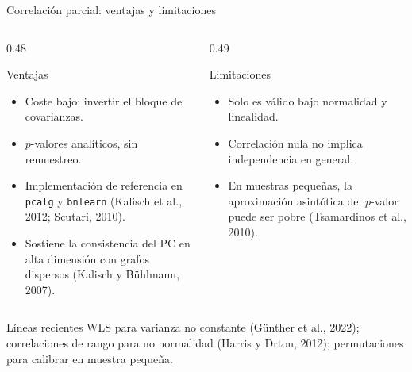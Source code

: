 \documentclass[aspectratio=169,11pt]{beamer}
\newcommand{\srccite}[1]{{\scriptsize\color{upmgray}(#1)}}
\begin{document}
\begin{frame}[t]{Correlación parcial: ventajas y limitaciones}
  \small
  \begin{columns}[T,onlytextwidth]
    \begin{column}{0.48\textwidth}
      \begin{block}{Ventajas}
        \begin{itemize}
          \item Coste bajo: invertir el bloque de covarianzas.
          \item $p$-valores analíticos, sin remuestreo.
          \item Implementación de referencia en \texttt{pcalg} y
                \texttt{bnlearn} \srccite{Kalisch et al., 2012; Scutari, 2010}.
          \item Sostiene la consistencia del PC en alta dimensión con grafos
                dispersos \srccite{Kalisch y Bühlmann, 2007}.
        \end{itemize}
      \end{block}
    \end{column}
    \begin{column}{0.49\textwidth}
      \begin{alertblock}{Limitaciones}
        \begin{itemize}
          \item Solo es válido bajo normalidad y linealidad.
          \item Correlación nula no implica independencia en general.
          \item En muestras pequeñas, la aproximación asintótica del
                $p$-valor puede ser pobre \srccite{Tsamardinos et al., 2010}.
        \end{itemize}
      \end{alertblock}
    \end{column}
  \end{columns}
  \vspace{0.2cm}
  \begin{exampleblock}{Líneas recientes}
    WLS para varianza no constante \srccite{Günther et al., 2022};
    correlaciones de rango para no normalidad
    \srccite{Harris y Drton, 2012}; permutaciones para
    calibrar en muestra pequeña.
  \end{exampleblock}
\end{frame}

\end{document}
